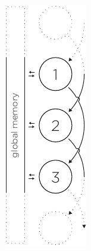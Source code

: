 
\begin{figure}
  \begin{minipage}[t]{0.20\textwidth}
    \centering
    \includegraphics[page=1, height=2\linewidth]{../resources/invariance.pdf}

\end{minipage}
\end{figure}

